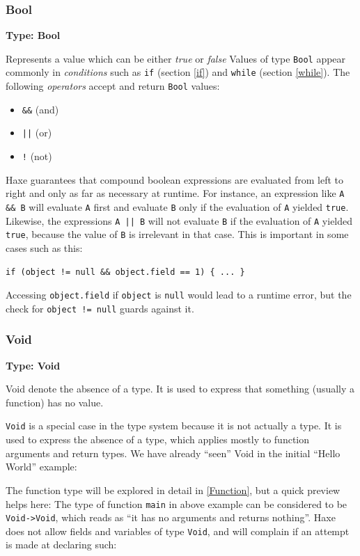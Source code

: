 \documentclass{article}
\newcommand{\type}[1]{\texttt{#1}}
\newcommand{\expr}[1]{\texttt{#1}}
\newenvironment{myshaded}
  {\def\FrameCommand{\fboxsep=\topsep\colorbox{bgcolor}}%
  \MakeFramed {\advance\hsize-\width \FrameRestore}}%
 {\endMakeFramed}
\newcommand{\define}[3][Definition]
	{\begin{myshaded}\noindent\textbf{#1: #2}\par\nobreak\noindent\ignorespaces#3\label{def:#2}\end{myshaded}}
\begin{document}
\subsubsection{Bool}
\label{Bool}
\define[Type]{Bool}{Represents a value which can be either \emph{true} or \emph{false}}
Values of type \type{Bool} appear commonly in \emph{conditions} such as \expr{if} (section \ref{if}) and \expr{while} (section \ref{while}). The following \emph{operators} accept and return \type{Bool} values:
\begin{itemize}
	\item \expr{\&\&} (and)
	\item \expr{||} (or)
	\item \expr{!} (not)
\end{itemize}
Haxe guarantees that compound boolean expressions are evaluated from left to right and only as far as necessary at runtime. For instance, an expression like \expr{A \&\& B} will evaluate \expr{A} first and evaluate \expr{B} only if the evaluation of \expr{A} yielded \expr{true}. Likewise, the expressions \expr{A || B} will not evaluate \expr{B} if the evaluation of \expr{A} yielded \expr{true}, because the value of \expr{B} is irrelevant in that case.
This is important in some cases such as this:

\begin{lstlisting}
if (object != null && object.field == 1) { ... }
\end{lstlisting}
Accessing \expr{object.field} if \expr{object} is \expr{null} would lead to a runtime error, but the check for \expr{object != null} guards against it.




\subsubsection{Void}
\label{Void}

\define[Type]{Void}{Void denote the absence of a type. It is used to express that something (usually a function) has no value.}

\type{Void} is a special case in the type system because it is not actually a type. It is used to express the absence of a type, which applies mostly to function arguments and return types.
We have already ``seen'' Void in the initial ``Hello World'' example:


The function type will be explored in detail in \cref{Function}, but a quick preview helps here: The type of function \expr{main} in above example can be considered to be \type{Void->Void}, which reads as ``it has no arguments and returns nothing''.
Haxe does not allow fields and variables of type \type{Void}, and will complain if an attempt is made at declaring such:
\end{document}
